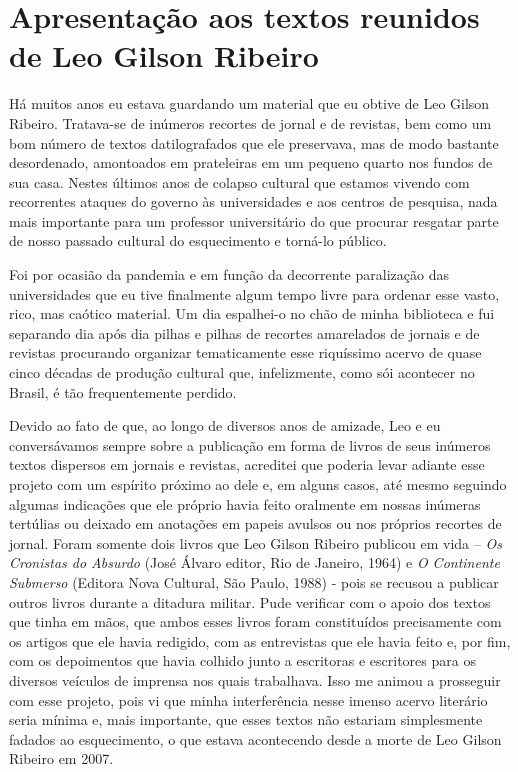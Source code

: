 \hypertarget{apresentauxe7uxe3o-aos-textos-reunidos-de-leo-gilson-ribeiro}{%
\section*{Apresentação aos textos reunidos de Leo Gilson
Ribeiro}\label{apresentauxe7uxe3o-aos-textos-reunidos-de-leo-gilson-ribeiro}}

Há muitos anos eu estava guardando um material que eu obtive de Leo
Gilson Ribeiro. Tratava-se de inúmeros recortes de jornal e de revistas,
bem como um bom número de textos datilografados que ele preservava, mas
de modo bastante desordenado, amontoados em prateleiras em um pequeno
quarto nos fundos de sua casa. Nestes últimos anos de colapso cultural
que estamos vivendo com recorrentes ataques do governo às universidades
e aos centros de pesquisa, nada mais importante para um professor
universitário do que procurar resgatar parte de nosso passado cultural
do esquecimento e torná-lo público.

Foi por ocasião da pandemia e em função da decorrente paralização das
universidades que eu tive finalmente algum tempo livre para ordenar esse
vasto, rico, mas caótico material. Um dia espalhei-o no chão de minha
biblioteca e fui separando dia após dia pilhas e pilhas de recortes
amarelados de jornais e de revistas procurando organizar tematicamente
esse riquíssimo acervo de quase cinco décadas de produção cultural que,
infelizmente, como sói acontecer no Brasil, é tão frequentemente
perdido.

Devido ao fato de que, ao longo de diversos anos de amizade, Leo e eu
conversávamos sempre sobre a publicação em forma de livros de seus
inúmeros textos dispersos em jornais e revistas, acreditei que poderia
levar adiante esse projeto com um espírito próximo ao dele e, em alguns
casos, até mesmo seguindo algumas indicações que ele próprio havia feito
oralmente em nossas inúmeras tertúlias ou deixado em anotações em papeis
avulsos ou nos próprios recortes de jornal. Foram somente dois livros
que Leo Gilson Ribeiro publicou em vida -- \emph{Os Cronistas do
Absurdo} (José Álvaro editor, Rio de Janeiro, 1964) e \emph{O Continente
Submerso} (Editora Nova Cultural, São Paulo, 1988) - pois se recusou a
publicar outros livros durante a ditadura militar. Pude verificar com o
apoio dos textos que tinha em mãos, que ambos esses livros foram
constituídos precisamente com os artigos que ele havia redigido, com as
entrevistas que ele havia feito e, por fim, com os depoimentos que havia
colhido junto a escritoras e escritores para os diversos veículos de
imprensa nos quais trabalhava. Isso me animou a prosseguir com esse
projeto, pois vi que minha interferência nesse imenso acervo literário
seria mínima e, mais importante, que esses textos não estariam
simplesmente fadados ao esquecimento, o que estava acontecendo desde a
morte de Leo Gilson Ribeiro em 2007.


